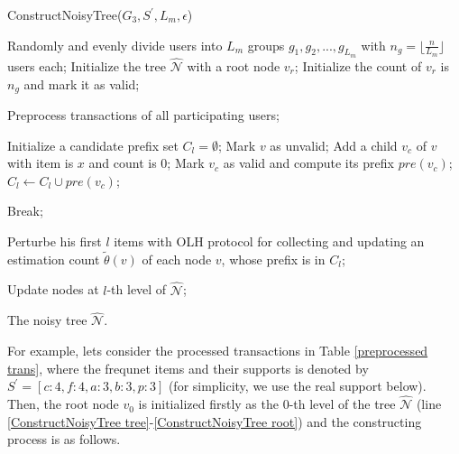 \documentclass[conference]{IEEEtran}
\begin{document}
\begin{algorithm}[htbp]
  \caption{ConstructNoisyTree($G_3,S^{\prime},L_m,\epsilon$)}
  \label{alg ConstructNoisyTree}
  \begin{algorithmic}[1]
  \STATE Randomly and evenly divide users into $L_m$ groups $g_1,g_2,...,g_{L_m}$ with $n_g = \lfloor \frac{n}{L_m} \rfloor$ users each;
  \STATE Initialize the tree $\hat{\mathcal{N}}$ with a root node $v_r$; \label{ConstructNoisyTree tree}
  \STATE Initialize the count of $v_r$ is $n_g$ and mark it as valid;\label{ConstructNoisyTree root}

  \STATE Preprocess transactions of all participating users;

      \STATE Initialize a candidate prefix set $C_l = \emptyset$;
      \STATE Mark $v$ as unvalid;
       \label{ConstructNoisyTree add child}
        \STATE Add a child $v_c$ of $v$ with item is $x$ and count is 0;\label{ConstructNoisyTree child}
        \STATE Mark $v_c$ as valid and compute its prefix $pre(v_c)$;\label{ConstructNoisyTree child prefix}
        \STATE $C_l \gets C_l \cup pre(v_c)$;\label{ConstructNoisyTree child prefix set}
      \ENDFOR
    \ENDWHILE
 
    \STATE Break;
    \ENDIF
    

     \label{ConstructNoisyTree estimate}
    \STATE Perturbe his first $l$ items with OLH protocol for collecting and updating an estimation count $\tilde{\theta}(v)$ of each node $v$, whose prefix is in $C_{l}$;
    \ENDFOR

    \STATE Update nodes at $l$-th level of $\hat{\mathcal{N}}$; \label{ConstructNoisyTree update}
  \ENDFOR

  \RETURN The noisy tree $\hat{\mathcal{N}}$.
  
  \end{algorithmic}
\end{algorithm}

For example, lets consider the processed transactions in Table \ref{preprocessed trans}, where the frequnet items and their supports is denoted by $S^{\prime} = \left[c:4 , f:4 , a:3 , b:3, p:3  \right]$ (for simplicity, we use the real support below). Then, the root node $v_0$ is initialized firstly as the 0-th level of the tree $\hat{\mathcal{N}}$ (line \ref{ConstructNoisyTree tree}-\ref{ConstructNoisyTree root}) and the constructing process is as follows.
\end{document}
